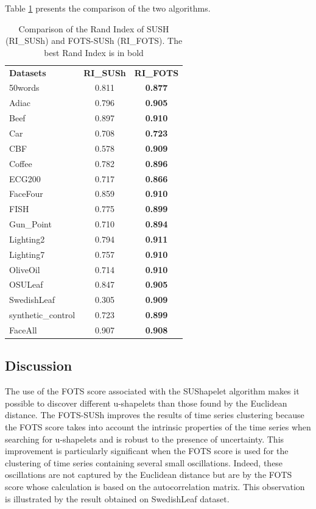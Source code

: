Table \ref{ri} presents the comparison of the two algorithms.

\begin{table}[ht]
\centering
\begin{tabular}{lcc}
\textbf{Datasets}  & \textbf{RI\_SUSh} & \textbf{RI\_FOTS} \\
50words            & 0.811             & \textbf{0.877}    \\
Adiac              & 0.796             & \textbf{0.905}    \\
Beef               & 0.897             & \textbf{0.910}    \\
Car                & 0.708             & \textbf{0.723}    \\
CBF                & 0.578             & \textbf{0.909}    \\
Coffee             & 0.782             & \textbf{0.896}    \\
ECG200             & 0.717             & \textbf{0.866}    \\
FaceFour           & 0.859             & \textbf{0.910}    \\
FISH               & 0.775             & \textbf{0.899}    \\
Gun\_Point         & 0.710             & \textbf{0.894}    \\
Lighting2          & 0.794             & \textbf{0.911}    \\
Lighting7          & 0.757             & \textbf{0.910}    \\
OliveOil           & 0.714             & \textbf{0.910}    \\
OSULeaf            & 0.847             & \textbf{0.905}    \\
SwedishLeaf        & 0.305             & \textbf{0.909}    \\
synthetic\_control & 0.723             & \textbf{0.899}    \\
FaceAll            & 0.907             & \textbf{0.908}   
\end{tabular}
\caption{Comparison of the Rand Index of SUSH (RI\_SUSh) and FOTS-SUSh (RI\_FOTS). The best Rand Index is in bold}
\label{ri}
\end{table}

				
\subsection{Discussion}

The use of the FOTS score associated with the SUShapelet algorithm makes it
possible to discover different u-shapelets than those found by the Euclidean
distance. The FOTS-SUSh improves the results of time series clustering because the FOTS score takes into account the intrinsic properties of the time series when searching for u-shapelets and is robust to the presence of uncertainty. This improvement is particularly significant when the FOTS score is used for the clustering of time series containing several small oscillations. Indeed, these oscillations are not captured by the Euclidean distance but are by the FOTS score whose calculation is based on the autocorrelation matrix. This observation is illustrated by the result obtained on  SwedishLeaf dataset.

